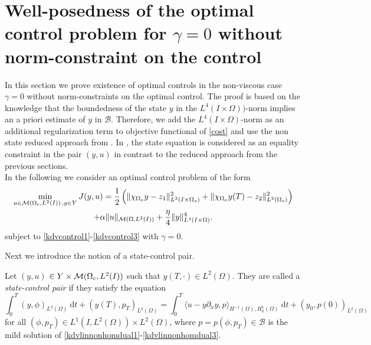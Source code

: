 \section{Well-posedness of the optimal control problem for $\gamma=0$ without norm-constraint on the control}
\label{wp2}
In this section we prove existence of optimal controls in the non-viscous case $\gamma=0$ without norm-constraints on the optimal control. The proof is based on the knowledge that the boundedness of the state $y$ in the $L^4(I\times\Omega))$-norm implies an a priori estimate of $y$ in $\mathcal B$. Therefore, we add the $L^4(I\times\Omega)$-norm as an additional regularization term to objective functional of \eqref{cost} and use the non state reduced approach from \cite{lions1985control}. In \cite{lions1985control}, the state equation is considered as an equality constraint in the pair $(y,u)$ in contrast to the reduced approach from the previous sections.\\
In the following we consider an optimal control problem of the form
\begin{multline}
\min_{u \in \M\,,y\in Y}J(y,u)=\frac{1}{2}\left(\norm{\chi_{\Omega_{o}}y - z_1}_{L^2(I\times \Omega_{o})}^2+\|\chi_{\Omega_{o}}y(T)-z_2\|_{L^2(\Omega_{o})}^2\right) \\+ \alpha \norm{u}_{\mathcal{M}(\Omega, L^{2}(I))} + \frac{\eta}{4} \norm{y}_{L^4(I\times \Omega)}^4.
\label{cost2}
\end{multline}
subject to \eqref{kdvcontrol1}-\eqref{kdvcontrol3} with $\gamma=0$. %

Next we introduce the notion of a state-control pair.
\begin{definition}\label{statecontrolpair}
Let $(y,u)$ $\in Y\times \mathcal{M}(\Omega_c, L^{2}(I))$ such that $y(T,\cdot)\in L^2(\Omega)$. They are called a \textit{state-control pair} if they satisfy the equation
\begin{equation}\label{weakformkdv L4}
\int_0^T(y,\phi)_{L^2(\Omega)}~\mathrm dt+(y(T),p_T)_{L^2(\Omega)}=\int_0^T\langle u-y\partial_xy,p\rangle_{H^{-1}(\Omega),H^1_0(\Omega)}~\mathrm dt+(y_0,p(0))_{L^2(\Omega)}
\end{equation}
for all $(\phi,p_T) \in L^{1}(I,L^2(\Omega))\times L^2(\Omega)$, where $p = p(\phi,p_T)\in \mathcal B$ is the mild solution of \eqref{kdvlinnonhomdual1}-\eqref{kdvlinnonhomdual3}.
\end{definition}

